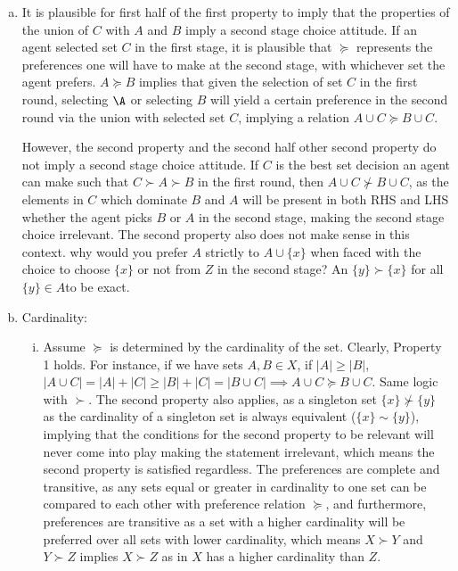 \documentclass{article}
\begin{document}
\begin{enumerate}[(a)]
    \item It is plausible for first half of the first property to imply that the properties of the union of $C$ with $A$ and $B$ imply a second stage choice attitude. If an agent selected set $C$ in the first stage, it is plausible that $\succeq$ represents the preferences one will have to make at  the second stage, with whichever set the agent prefers. $A\succeq B$ implies that given the selection of set $C$ in the first round, selecting $\A$ or selecting $B$ will yield a certain preference in the second round via the union with selected set $C$, implying a relation $A\cup C\succeq B\cup C$.
    
    However, the second property and the second half other second property do not imply a second stage choice attitude. If $C$ is the best set decision an agent can make such that $C\succ A \succ B$ in the first round, then $A\cup C \nsucc B\cup C$, as the elements in $C$ which dominate $B$ and $A$ will be present in both RHS and LHS whether the agent picks $B$ or $A$ in the second stage, making the second stage choice irrelevant. The second property also does not make sense in this context. why would you prefer $A$ strictly to $A\cup \{x\}$ when faced with the choice to choose $\{x\}$ or not from $Z$ in the second stage? An $\{y\}\succ\{x\}$ for all $\{y\}\in A $to be exact.  

    \item Cardinality: \begin{enumerate}[(i)]
        \item Assume $\succeq$ is determined by the cardinality of the set. Clearly, Property 1 holds. For instance, if we have sets $A, B \in X$, if $|A|\geq |B|$, $|A\cup C|=|A|+|C|\geq |B|+|C|=|B\cup C|\implies A\cup C \succeq B\cup C$. Same logic with $\succ$. The second property also applies, as a singleton set $\{x\} \nsucc \{y\}$ as the cardinality of a singleton set is always equivalent ($\{x\} \sim \{y\}$), implying that the conditions for the second property to be relevant will never come into play making the statement irrelevant, which means the second property is satisfied regardless. The preferences are complete and transitive, as any sets equal or greater in cardinality to one set can be compared to each other with preference relation $\succeq$, and furthermore, preferences are transitive as a set with a higher cardinality will be preferred over all sets with lower cardinality, which means $X\succ Y$ and $Y\succ Z$ implies $X\succ Z$ as in $X$ has a higher cardinality than $Z$.
        

\end{enumerate}
\end{enumerate}
\end{document}
